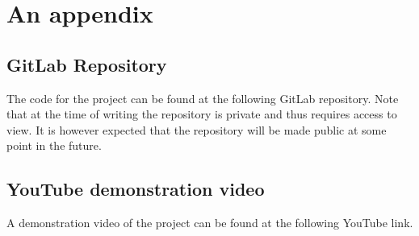 \documentclass[ twoside,openright,titlepage,numbers=noenddot,headinclude,%
                footinclude=true,cleardoublepage=empty,abstractoff, %
                BCOR=5mm,paper=a4,fontsize=11pt,%
                ngerman,american,%
                ]{scrreprt}
\begin{document}
\appendix
\cleardoublepage

\chapter{An appendix}
\label{cha:an-appendix}

\section{GitLab Repository}
The code for the project can be found at the following GitLab repository. Note that at the time of writing the repository is private and thus requires access to view. It is however expected that the repository will be made public at some point in the future.\\

\section{YouTube demonstration video}
A demonstration video of the project can be found at the following YouTube link.\\




\cleardoublepage

\end{document}
